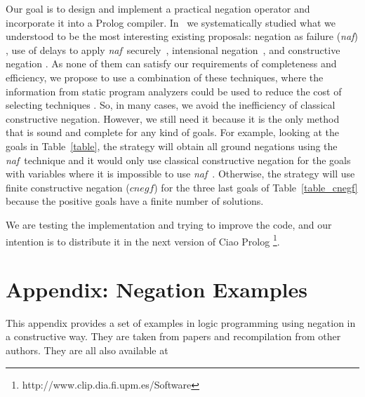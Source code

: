 \documentclass{tlp}
\newcommand{\naf}{{\em naf}}\newcommand{\viejo}[1]{}
\begin{document}
Our goal is to design and implement a practical negation operator and
incorporate it into a Prolog compiler.
In~\cite{SusanaPADL2000,SusanaLPAR01} we systematically studied what
we understood to be the most interesting existing proposals: negation
as failure (\naf) \cite{Clark}, use of delays to apply \naf\
securely~\cite{naish:lncs}, intensional
negation~\cite{Barbuti1,Barbuti2}, and constructive negation
\cite{Chan1,Chan2,Drabent,Stuckey,Stuckey95}. As none of them can
satisfy our requirements of completeness and efficiency, we propose to
use a combination of these techniques, where the information from
static program analyzers could be used to reduce the cost of selecting
techniques \cite{SusanaLPAR01}. So, in many cases, we avoid the
inefficiency of classical constructive negation. However, we still
need it because it is the only method that is sound and complete for
any kind of goals. For example, looking at the goals in
Table~\ref{table}, the strategy will obtain all ground negations using
the \naf\ technique and it would only use classical constructive
negation for the goals with variables where it is impossible to use
\naf\ . Otherwise, the strategy will use finite constructive negation
($cnegf$) for the three last goals of Table~\ref{table_cnegf} because
the positive goals have a finite number of solutions.

We are testing the implementation and trying to improve the code, and
our intention is to distribute it in the next version of Ciao Prolog
\footnote{http://www.clip.dia.fi.upm.es/Software}.
  





\newpage

\appendix

\section*{Appendix: Negation Examples}

This appendix provides a set of examples in logic programming using
negation in a constructive way. They are taken from papers and
recompilation from other authors. They are all also available at 
\end{document}
